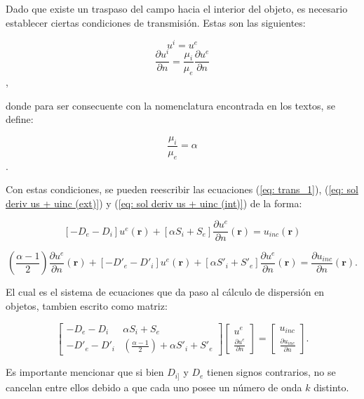 \documentclass[12pt,letterpaper]{report}
\numberwithin{equation}{section}
\begin{document}
Dado que existe un traspaso del campo hacia el interior del objeto, es necesario establecer ciertas condiciones de transmisión. Estas son las siguientes:

$$u^{i} = u^{e}$$
$$\frac{\partial u^{i}}{\partial n} =\frac{\mu_{i}}{\mu_{e}} \frac{\partial u^{e}}{\partial n}$$,

\noindent donde para ser consecuente con la nomenclatura encontrada en los textos, se define:

$$\frac{\mu_{i}}{\mu_{e}} = \alpha$$.


Con estas condiciones, se pueden reescribir las ecuaciones (\ref{eq: trans_1}), (\ref{eq: sol deriv us + uinc (ext)}) y (\ref{eq: sol deriv us + uinc (int)}) de la forma:

\begin{equation}
\left[-D_{e} - D_{i}\right] u^{e}(\textbf{r}) + \left[\alpha S_{i} + S_{e}\right]\frac{\partial u^{e}}{\partial n}(\textbf{r}) = u_{inc}(\textbf{r}) 
\label{eq: trans_2}		
\end{equation}

\begin{equation}
(\frac{\alpha - 1}{2})\frac{\partial u^{e}}{\partial n}(\textbf{r}) + \left[-D'_{e} - D'_{i}\right] u^{e}(\textbf{r}) + \left[\alpha S'_{i} + S'_{e}\right]\frac{\partial u^{e}}{\partial n}(\textbf{r}) = \frac{\partial u_{inc}}{\partial n}(\textbf{r}).
\label{eq: trans_deriv_2}		
\end{equation}

El cual es el sistema de ecuaciones que da paso al cálculo de dispersión en objetos, tambien escrito como matriz:

\begin{equation} 
\begin{bmatrix}
-D_{e} - D_{i} & \alpha S_{i} + S_{e}\\
-D'_{e} - D'_{i} & (\frac{\alpha - 1}{2})+\alpha S'_{i} + S'_{e}
\end{bmatrix}
\begin{bmatrix}
u^{e}\\
\frac{\partial u^{e}}{\partial n}
\end{bmatrix}
=
\begin{bmatrix}
u_{inc}\\
\frac{\partial u_{inc}}{\partial n}
\end{bmatrix}.
\label{eq:matriz trans}		 
\end{equation} 

Es importante mencionar que si bien $D_{i]}$ y $D_{e}$ tienen signos contrarios, no se cancelan entre ellos debido a que cada uno posee un número de onda $k$ distinto.
\end{document}
